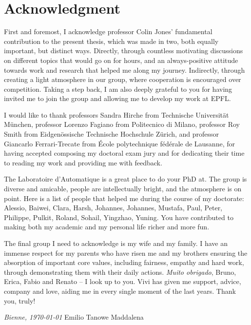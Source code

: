 \chapter*{Acknowledgment}


First and foremost, I acknowledge professor Colin Jones' fundamental contribution to the present thesis, which was made in two, both equally important, but distinct ways. Directly, through countless motivating discussions on different topics that would go on for hours, and an always-positive attitude towards work and research that helped me along my journey. Indirectly, through creating a light atmosphere in our group, where cooperation is encouraged over competition. Taking a step back, I am also deeply grateful to you for having invited me to join the group and allowing me to develop my work at EPFL. 

I would like to thank professors Sandra Hirche from Technische Universität München, professor Lorenzo Fagiano from Politecnico di Milano, professor Roy Smith from Eidgenössische Technische Hochschule Zürich, and professor Giancarlo Ferrari-Trecate from École polytechnique fédérale de Lausanne, for having accepted composing my doctoral exam jury and for dedicating their time to reading my work and providing me with feedback.

The Laboratoire d'Automatique is a great place to do your PhD at. The group is diverse and amicable, people are intellectually bright, and the atmosphere is on point. Here is a list of people that helped me during the course of my doctorate: Alessio, Baiwei, Clara, Harsh, Johannes, Johannes, Mustafa, Paul, Peter, Philippe, Pulkit, Roland, Sohail, Yingzhao, Yuning. You have contributed to making both my academic and my personal life richer and more fun.

The final group I need to acknowledge is my wife and my family. I have an immense respect for my parents who have risen me and my brothers ensuring the absorption of important core values, including fairness, empathy and hard work, through demonstrating them with their daily actions. \textit{Muito obrigado}, Bruno, Erica, Fabio and Renato -- I look up to you. Vivi has given me support, advice, company and love, aiding me in every single moment of the last years. Thank you, truly! 

\bigskip
 
\noindent\textit{Bienne, \today}
\hfill Emilio Tanowe Maddalena
